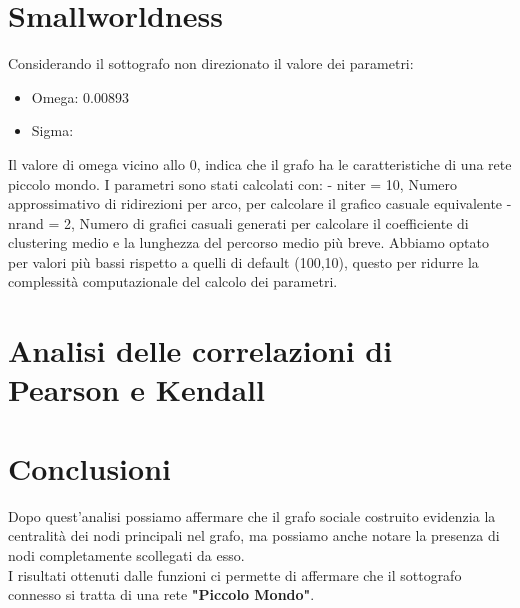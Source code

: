 \documentclass[a4paper,11pt]{report}
\begin{document}
\section{Smallworldness}
Considerando il sottografo non direzionato il valore dei parametri:
	\begin{itemize}
	\item Omega: 0.00893
	\item Sigma: 
\end{itemize}
Il valore di omega vicino allo 0, indica che il grafo ha le caratteristiche di una rete piccolo mondo.
I parametri sono stati calcolati con:\newline
- niter = 10, Numero approssimativo di ridirezioni per arco, per calcolare il grafico casuale equivalente\newline
- nrand = 2, Numero di grafici casuali generati per calcolare il coefficiente di clustering medio e la lunghezza del percorso medio più breve.\newline
Abbiamo optato per valori più bassi rispetto a quelli di default (100,10), questo per ridurre la complessità computazionale del calcolo dei parametri.

\section{Analisi delle correlazioni di Pearson e Kendall}


\pagebreak

\section{Conclusioni}
Dopo quest'analisi possiamo affermare che il grafo sociale costruito evidenzia la centralità dei nodi principali nel grafo, ma possiamo anche notare la presenza di nodi completamente scollegati da esso.\\
I risultati ottenuti dalle funzioni ci permette di affermare che il sottografo connesso si tratta di una rete \textbf{"Piccolo Mondo"}. \\
\pagebreak
\end{document}
